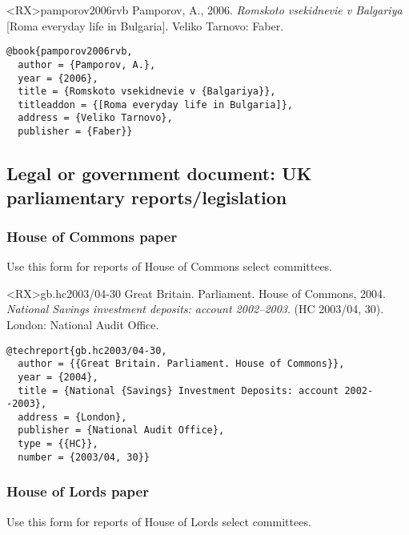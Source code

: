 \documentclass[10pt,a4paper]{article}
\newenvironment{tips}{%
  \begin{list}{\makebox[2em][c]{\faLightbulbO}}{%
    \setlength{\leftmargin}{2em}
    \setlength{\labelwidth}{2em}
    \setlength{\labelsep}{0pt}}
}{\end{list}}
\begin{document}
\begin{bibexbox}<RX>{pamporov2006rvb}
  Pamporov, A., 2006. \emph{Romskoto vsekidnevie v Balgariya} [Roma everyday life in Bulgaria]. Veliko Tarnovo: Faber.
  \tcblower
\begin{Verbatim}
@book{pamporov2006rvb,
  author = {Pamporov, A.},
  year = {2006},
  title = {Romskoto vsekidnevie v {Balgariya}},
  titleaddon = {[Roma everyday life in Bulgaria]},
  address = {Veliko Tarnovo},
  publisher = {Faber}}
\end{Verbatim}
\end{bibexbox}

\subsection{Legal or government document: UK parliamentary reports\slash legislation}


\subsubsection*{House of Commons paper}

\begin{tips}\item
Use this form for reports of House of Commons select committees.
\end{tips}

\begin{bibexbox}<RX>{gb.hc2003/04-30}
  Great Britain. Parliament. House of Commons, 2004. \emph{National Savings investment deposits: account 2002--2003}. (HC 2003/04, 30). London: National Audit Office.
  \tcblower
\begin{Verbatim}
@techreport{gb.hc2003/04-30,
  author = {{Great Britain. Parliament. House of Commons}},
  year = {2004},
  title = {National {Savings} Investment Deposits: account 2002--2003},
  address = {London},
  publisher = {National Audit Office},
  type = {{HC}},
  number = {2003/04, 30}}
\end{Verbatim}
\end{bibexbox}


\subsubsection*{House of Lords paper}

\begin{tips}\item
Use this form for reports of House of Lords select committees.
\end{tips}
\end{document}
